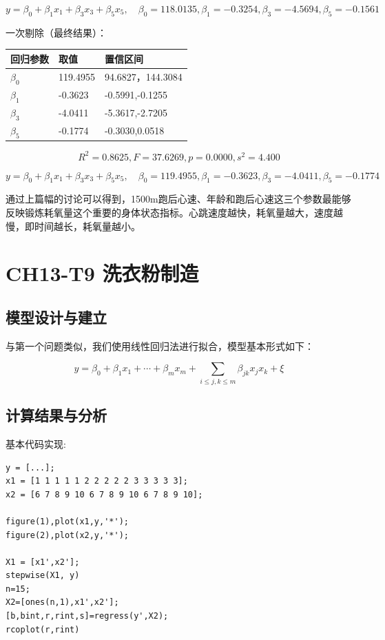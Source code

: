 \documentclass{article}
\begin{document}
$$y=\beta_0+\beta_1x_1+\beta_3x_3+\beta_5x_5,\quad \beta_0=118.0135,\beta_1=-0.3254,\beta_3=-4.5694,\beta_5=-0.1561$$


一次剔除（最终结果）：
\begin{table}[H]
\centering
\begin{tabular}{|l|l|l|}
\hline
回归参数 & 取值       & 置信区间             \\ \hline
$\beta_0$     & 119.4955 & 94.6827，144.3084 \\ \hline
$\beta_1$     & -0.3623  & -0.5991,-0.1255  \\ \hline
$\beta_3$     & -4.0411  & -5.3617,-2.7205  \\ \hline
$\beta_5$     & -0.1774  & -0.3030,0.0518   \\ \hline
\end{tabular}
\end{table}

$$R^2=0.8625,F=37.6269,p=0.0000,s^2=4.400$$

$$y=\beta_0+\beta_1x_1+\beta_3x_3+\beta_5x_5,\quad \beta_0=119.4955,\beta_1=-0.3623,\beta_3=-4.0411,\beta_5=-0.1774$$


通过上篇幅的讨论可以得到，1500m跑后心速、年龄和跑后心速这三个参数最能够反映锻炼耗氧量这个重要的身体状态指标。心跳速度越快，耗氧量越大，速度越慢，即时间越长，耗氧量越小。


\section{CH13-T9 洗衣粉制造}
\subsection{模型设计与建立}

与第一个问题类似，我们使用线性回归法进行拟合，模型基本形式如下：

$$y=\beta_0+\beta_1x_1+\cdots+\beta_mx_m+\sum_{i\leq j,k\leq m}\beta_{jk}x_jx_k+\xi$$

\subsection{计算结果与分析}

基本代码实现:

\begin{lstlisting}
y = [...];
x1 = [1 1 1 1 1 2 2 2 2 2 3 3 3 3 3];
x2 = [6 7 8 9 10 6 7 8 9 10 6 7 8 9 10];

figure(1),plot(x1,y,'*');
figure(2),plot(x2,y,'*');

X1 = [x1',x2'];
stepwise(X1, y)
n=15;
X2=[ones(n,1),x1',x2'];
[b,bint,r,rint,s]=regress(y',X2);
rcoplot(r,rint)

\end{lstlisting}
\end{document}
